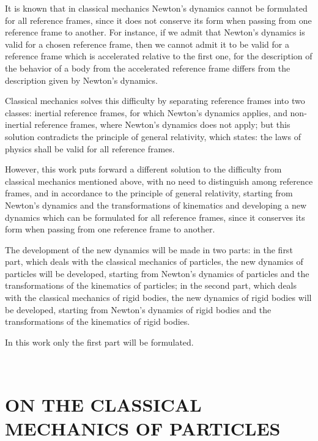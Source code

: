 \documentclass[12pt]{article}
\newcommand{\yi}{\vspace{0em}}
\newcommand{\za}{\ \vspace{-0.9em}}
\newcommand{\yN}{\newpage}%
\newcommand{\cA}{\centering}%
\begin{document}
\par It is known that in classical mechanics Newton's dynamics cannot be formulated for all reference frames, since it does not conserve its form when passing from one reference frame to another. For instance, if we admit that Newton's dynamics is valid for a chosen reference frame, then we cannot admit it to be valid for a reference frame which is accelerated relative to the first one, for the description of the behavior of a body from the accelerated reference frame differs from the description given by Newton's dynamics.
\yi
\par Classical mechanics solves this difficulty by separating reference frames into two classes: inertial reference frames, for which Newton's dynamics applies, and non-inertial reference frames, where Newton's dynamics does not apply; but this solution contradicts the principle of general relativity, which states: the laws of physics shall be valid for all reference frames.
\yi
\par However, this work puts forward a different solution to the difficulty from classical mechanics mentioned above, with no need to distinguish among reference frames, and in accordance to the principle of general relativity, starting from Newton's dynamics and the transformations of kinematics and developing a new dynamics which can be formulated for all reference frames, since it conserves its form when passing from one reference frame to another.
\yi
\par The development of the new dynamics will be made in two parts: in the first part, which deals with the classical mechanics of particles, the new dynamics of particles will be developed, starting from Newton's dynamics of particles and the transformations of the kinematics of particles; in the second part, which deals with the classical mechanics of rigid bodies, the new dynamics of rigid bodies will be developed, starting from Newton's dynamics of rigid bodies and the transformations of the kinematics of rigid bodies.
\yi
\par In this work only the first part will be formulated.

\yN \baselineskip=14.5pt \enlargethispage{0em}

\za

{\cA\section*{\LARGE {ON THE CLASSICAL MECHANICS OF PARTICLES}}}
\end{document}
